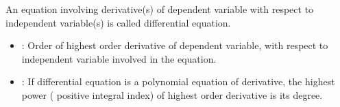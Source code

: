 An equation involving derivative(s) of dependent variable with respect to independent variable(s) is called differential equation.



\begin{itemize}
	\item {}: Order of highest order derivative of dependent variable, with respect to independent variable involved in the equation.
	\item {}: If differential equation is a polynomial equation of derivative, the highest power ( positive integral index) of highest order derivative is its degree.
\end{itemize}
